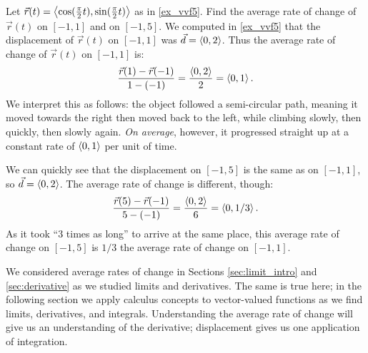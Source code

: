 \begin{example}\label{ex_vvf6}%
Let $\vec r(t) =\left\langle \cos(\frac{\pi}2t),\sin(\frac{\pi}2t)\right\rangle$ as in \autoref{ex_vvf5}. Find the average rate of change of $\vec r(t)$ on $[-1,1]$ and on $[-1,5]$.
\solution
We computed in \autoref{ex_vvf5} that the displacement of $\vec r(t)$ on $[-1,1]$ was $\vec d =\left\langle 0,2\right\rangle$. Thus the average rate of change of $\vec r(t)$ on $[-1,1]$ is:
\[\frac{\vec r(1) -\vec r(-1)}{1-(-1)} = \frac{\left\langle 0,2\right\rangle}{2} =\left\langle 0,1\right\rangle.\]
We interpret this as follows: the object followed a semi-circular path, meaning it moved towards the right then moved back to the left, while climbing slowly, then quickly, then slowly again. \emph{On average}, however, it progressed straight up at a constant rate of $\left\langle 0,1\right\rangle$ per unit of time.

We can quickly see that the displacement on $[-1,5]$ is the same as on $[-1,1]$, so $\vec d =\left\langle 0,2\right\rangle$. The average rate of change is different, though:
\[\frac{\vec r(5)-\vec r(-1)}{5-(-1)} = \frac{\left\langle 0,2\right\rangle}{6} =\left\langle 0,1/3\right\rangle.\]
As it took ``3 times as long'' to arrive at the same place, this average rate of change on $[-1,5]$ is $1/3$ the average rate of change on $[-1,1]$.
\end{example}

We considered average rates of change in Sections \ref{sec:limit_intro} and \ref{sec:derivative} as we studied limits and derivatives. The same is true here; in the following section we apply calculus concepts to vector-valued functions as we find limits, derivatives, and integrals. Understanding the average rate of change will give us an understanding of the derivative; displacement gives us one application of integration.

